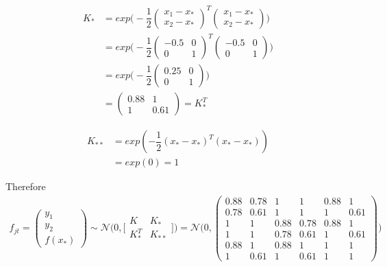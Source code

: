 \documentclass[11pt]{article}
\begin{document}
\begin{align*}
	K_* &= exp\big(-\dfrac{1}{2}
	\begin{pmatrix}
		x_1 - x_* \\
		x_2 - x_*
	\end{pmatrix}^T 
	\begin{pmatrix}
		x_1 - x_* \\
		x_2 - x_*
	\end{pmatrix}
	\big)\\	
	&= exp\big(-\dfrac{1}{2}
	\begin{pmatrix}
		-0.5 & 0\\
		0 & 1
	\end{pmatrix}^T 
	\begin{pmatrix}
		-0.5 & 0\\
		0 & 1
	\end{pmatrix}
	\big)\\	
	&= exp\big(-\dfrac{1}{2}
	\begin{pmatrix}
		0.25 & 0 \\
		0 & 1
	\end{pmatrix}
	\big)\\	
	&=
	\begin{pmatrix}
		0.88 & 1 \\
		1 & 0.61
	\end{pmatrix} = K^T_*
\end{align*}

\begin{align*}
	K_{**} &= exp(-\dfrac{1}{2} (x_* - x_*)^T (x_* - x_*)) \\
		   &= exp(0) = 1
\end{align*}

Therefore
\begin{align*}
	f_{jt} =
	\begin{pmatrix}
		y_1\\
		y_2\\
		f(x_*)
	\end{pmatrix}
	\sim \mathcal N \Big(0, \Big[
	\begin{matrix}
	K & K_* \\
	K^T_* & K_{**}
	\end{matrix}
	\Big]\Big)
	= \mathcal N \Big(0,
	\begin{pmatrix}
		0.88 & 0.78 & 1	& 1	& 0.88 & 1\\
		0.78 & 0.61 & 1 & 1 & 1 & 0.61\\
		1 & 1 & 0.88 & 0.78 & 0.88 & 1\\
		1 & 1 & 0.78 & 0.61 & 1 & 0.61\\
		0.88 & 1 & 0.88 & 1 & 1 & 1\\
		1 & 0.61 & 1 & 0.61 & 1 & 1
	\end{pmatrix}
	\Big)
\end{align*}
\end{document}

